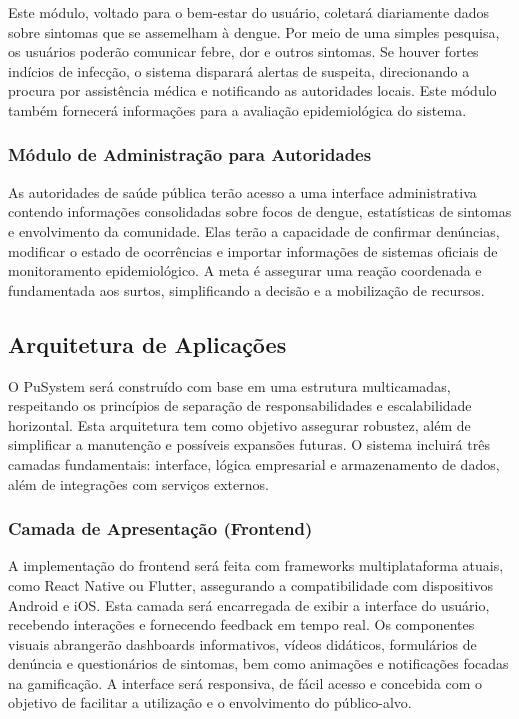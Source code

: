 \documentclass[a5paper, 12pt]{article}
\begin{document}
Este módulo, voltado para o bem-estar do usuário, coletará diariamente dados sobre sintomas que se assemelham à dengue.  Por meio de uma simples pesquisa, os usuários poderão comunicar febre, dor e outros sintomas.  Se houver fortes indícios de infecção, o sistema disparará alertas de suspeita, direcionando a procura por assistência médica e notificando as autoridades locais.  Este módulo também fornecerá informações para a avaliação epidemiológica do sistema.

\subsubsection{Módulo de Administração para Autoridades}

As autoridades de saúde pública terão acesso a uma interface administrativa contendo informações consolidadas sobre focos de dengue, estatísticas de sintomas e envolvimento da comunidade.  Elas terão a capacidade de confirmar denúncias, modificar o estado de ocorrências e importar informações de sistemas oficiais de monitoramento epidemiológico.  A meta é assegurar uma reação coordenada e fundamentada aos surtos, simplificando a decisão e a mobilização de recursos.


\subsection{Arquitetura de Aplicações}

O PuSystem será construído com base em uma estrutura multicamadas, respeitando os princípios de separação de responsabilidades e escalabilidade horizontal.  Esta arquitetura tem como objetivo assegurar robustez, além de simplificar a manutenção e possíveis expansões futuras.  O sistema incluirá três camadas fundamentais: interface, lógica empresarial e armazenamento de dados, além de integrações com serviços externos.

\subsubsection{Camada de Apresentação (Frontend)}

A implementação do frontend será feita com frameworks multiplataforma atuais, como React Native ou Flutter, assegurando a compatibilidade com dispositivos Android e iOS.  Esta camada será encarregada de exibir a interface do usuário, recebendo interações e fornecendo feedback em tempo real.
Os componentes visuais abrangerão dashboards informativos, vídeos didáticos, formulários de denúncia e questionários de sintomas, bem como animações e notificações focadas na gamificação.  A interface será responsiva, de fácil acesso e concebida com o objetivo de facilitar a utilização e o envolvimento do público-alvo.
\end{document}
